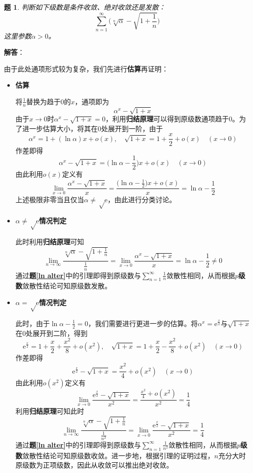 \documentclass[a4paper,UTF8,fontset=windows,AutoFakeBold]{ctexart}
\newcommand*{\er}{\mathrm{e}}
\newcommand*{\suminf}[1][n=1]{\sum_{#1}^\infty}
\theoremstyle{ex}
\newtheorem{exercise}{题}
\newcommand{\exref}[1]{\textbf{题\;\ref{#1}\;}}
\newcommand{\sol}[1]{{\vspace{5pt}\kaishu\noindent\textbf{解答}：\vspace{-3pt}
\begin{compactitem}
    \item[] #1
\end{compactitem}
}}
\begin{document}
\begin{framed}
\begin{exercise}
    判断如下级数是条件收敛、绝对收敛还是发散：
    $$\suminf\bigg(\sqrt[n]{\alpha}-\sqrt{1+\frac{1}{n}}\bigg)$$
    这里参数$\alpha>0$。
\end{exercise}
\sol{
    由于此处通项形式较为复杂，我们先进行\textbf{估算}再证明：
    \begin{itemize}
        \item \textbf{估算}
        
        将$\frac{1}{n}$替换为趋于0的$x$，通项即为
        $$\alpha^x-\sqrt{1+x}$$
        由于$x\to0$时$\alpha^x-\sqrt{1+x}=0$，利用\textbf{归结原理}可以得到原级数通项趋于0。为了进一步估算大小，将其在0处展开到一阶，由于
        $$\alpha^x=1+(\ln\alpha)x+o(x),\quad\sqrt{1+x}=1+\frac{x}{2}+o(x)\quad(x\to0)$$
        作差即得
        $$\alpha^x-\sqrt{1+x}=\bigg(\ln\alpha-\frac{1}{2}\bigg)x+o(x)\quad(x\to0)$$
        由此利用$o(x)$定义有
        $$\lim_{x\to0}\frac{\alpha^x-\sqrt{1+x}}{x}=\frac{\big(\ln\alpha-\frac{1}{2}\big)x+o(x)}{x}=\ln\alpha-\frac{1}{2}$$
        上述极限非零当且仅当$\alpha\ne\sqrt\er$，由此进行分类讨论。

        \item \textbf{$\alpha\ne\sqrt\er$情况判定}
        
        此时利用\textbf{归结原理}可知
        $$\lim_{n\to\infty}\frac{\sqrt[n]{\alpha}-\sqrt{1+\frac{1}{n}}}{\frac{1}{n}}=\lim_{x\to0}\frac{\alpha^x-\sqrt{1+x}}{x}=\ln\alpha-\frac{1}{2}\ne0$$
        通过\exref{ln alter}中的引理即得到原级数与$\suminf\frac{1}{n}$敛散性相同，从而根据\textbf{$p$级数}敛散性结论可知原级数发散。

        \item \textbf{$\alpha=\sqrt\er$情况判定}
        
        此时，由于$\ln\alpha-\frac{1}{2}=0$，我们需要进行更进一步的估算。将$\alpha^x=\er^{\frac{x}{2}}$与$\sqrt{1+x}$在0处展开到二阶，得到
        $$\er^{\frac{x}{2}}=1+\frac{x}{2}+\frac{x^2}{8}+o(x^2),\quad\sqrt{1+x}=1+\frac{x}{2}-\frac{x^2}{8}+o(x^2)\quad(x\to0)$$
        作差即得
        $$\er^{\frac{x}{2}}-\sqrt{1+x}=\frac{x^2}{4}+o(x^2)\quad(x\to0)$$
        由此利用$o(x^2)$定义有
        $$\lim_{x\to0}\frac{\er^{\frac{x}{2}}-\sqrt{1+x}}{x^2}=\frac{\frac{x^2}{4}+o(x^2)}{x^2}=\frac{1}{4}$$
        利用\textbf{归结原理}可知此时
        $$\lim_{n\to\infty}\frac{\sqrt[n]{\alpha}-\sqrt{1+\frac{1}{n}}}{\frac{1}{n^2}}=\lim_{x\to0}\frac{\er^{\frac{x}{2}}-\sqrt{1+x}}{x^2}=\frac{1}{4}$$
        通过\exref{ln alter}中的引理即得到原级数与$\suminf\frac{1}{n^2}$敛散性相同，从而根据\textbf{$p$级数}敛散性结论可知原级数收敛。进一步地，根据引理的证明过程，$n$充分大时原级数为正项级数，因此从收敛可以推出绝对收敛。
    \end{itemize}
}
\end{framed}
\end{document}

